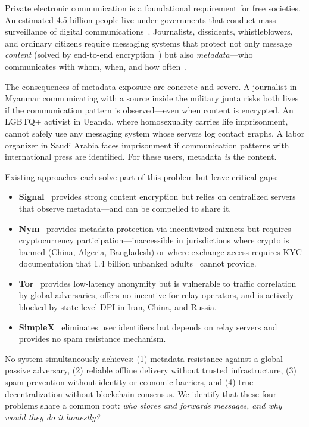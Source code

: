 \documentclass[11pt,a4paper]{article}
\begin{document}
Private electronic communication is a foundational requirement for free societies. An estimated 4.5 billion people live under governments that conduct mass surveillance of digital communications~\cite{freedomhouse}. Journalists, dissidents, whistleblowers, and ordinary citizens require messaging systems that protect not only message \emph{content} (solved by end-to-end encryption~\cite{signal-protocol}) but also \emph{metadata}---who communicates with whom, when, and how often~\cite{metadata-kills}.

The consequences of metadata exposure are concrete and severe. A journalist in Myanmar communicating with a source inside the military junta risks both lives if the communication pattern is observed---even when content is encrypted. An LGBTQ+ activist in Uganda, where homosexuality carries life imprisonment, cannot safely use any messaging system whose servers log contact graphs. A labor organizer in Saudi Arabia faces imprisonment if communication patterns with international press are identified. For these users, metadata \emph{is} the content.

Existing approaches each solve part of this problem but leave critical gaps:

\begin{itemize}[nosep]
    \item \textbf{Signal}~\cite{signal-protocol} provides strong content encryption but relies on centralized servers that observe metadata---and can be compelled to share it.
    \item \textbf{Nym}~\cite{nym-whitepaper} provides metadata protection via incentivized mixnets but requires cryptocurrency participation---inaccessible in jurisdictions where crypto is banned (China, Algeria, Bangladesh) or where exchange access requires KYC documentation that 1.4 billion unbanked adults~\cite{worldbank} cannot provide.
    \item \textbf{Tor}~\cite{tor-design} provides low-latency anonymity but is vulnerable to traffic correlation by global adversaries, offers no incentive for relay operators, and is actively blocked by state-level DPI in Iran, China, and Russia.
    \item \textbf{SimpleX}~\cite{simplex-chat} eliminates user identifiers but depends on relay servers and provides no spam resistance mechanism.
\end{itemize}

No system simultaneously achieves: (1) metadata resistance against a global passive adversary, (2) reliable offline delivery without trusted infrastructure, (3) spam prevention without identity or economic barriers, and (4) true decentralization without blockchain consensus. We identify that these four problems share a common root: \emph{who stores and forwards messages, and why would they do it honestly?}
\end{document}
